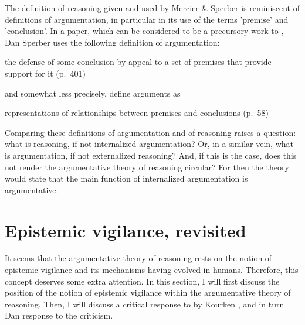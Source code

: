 The definition of reasoning given and used by Mercier \& Sperber is reminiscent of definitions of argumentation, in particular in its use of the terms 'premise' and 'conclusion'. In a \citeyear{Sperber01} paper, which can be considered to be a precursory work to \citet{MS11}, Dan Sperber uses the following definition of argumentation:
\begin{quoting}
    the defense of some conclusion by appeal to a set of premises that provide support for it
    \hfill (p.~401)
\end{quoting}
and somewhat less precisely, \citet{MS11} define arguments as
\begin{quoting}
    representations of relationships between premises and conclusions
    \hfill (p.~58)
\end{quoting}

Comparing these definitions of argumentation and of reasoning raises a question: what is reasoning, if not internalized argumentation? Or, in a similar vein, what is argumentation, if not externalized reasoning? And, if this is the case, does this not render the argumentative theory of reasoning circular? For then the theory would state that the main function of internalized argumentation is argumentative.

\section{Epistemic vigilance, revisited}
\label{sec:EV-scrutiny}

It seems that the argumentative theory of reasoning rests on the notion of epistemic vigilance and its mechanisms having evolved in humans. Therefore, this concept deserves some extra attention.
In this section, I will first discuss the position of the notion of epistemic vigilance within the argumentative theory of reasoning. Then, I will discuss a critical response to \citet{Sperber10} by Kourken \citet{Michaelian13}, and in turn Dan  response to the criticism.

